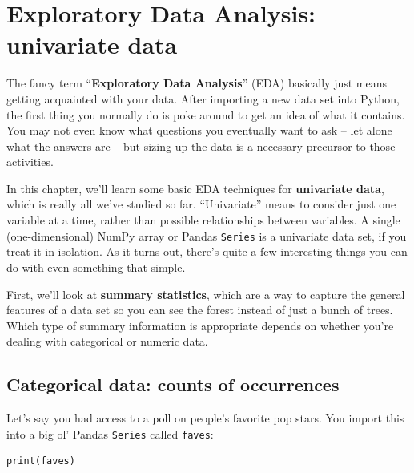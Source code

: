 
\chapter{Exploratory Data Analysis: univariate data}
\label{ch:edaUnivariate}


The fancy term ``\textbf{Exploratory Data Analysis}'' (EDA) basically just
means getting acquainted with your data. After importing a new data set into
Python, the first thing you normally do is poke around to get an idea of what
it contains. You may not even know what questions you eventually want to ask --
let alone what the answers are -- but sizing up the data is a necessary
precursor to those activities.


In this chapter, we'll learn some basic EDA techniques for \textbf{univariate
data}, which is really all we've studied so far. ``Univariate'' means to
consider just one variable at a time, rather than possible relationships
between variables. A single (one-dimensional) NumPy array or Pandas
\texttt{Series} is a univariate data set, if you treat it in isolation. As it
turns out, there's quite a few interesting things you can do with even
something that simple.



First, we'll look at \textbf{summary statistics}, which are a way to capture
the general features of a data set so you can see the forest instead of just a
bunch of trees. Which type of summary information is appropriate depends on
whether you're dealing with categorical or numeric data.

\section{Categorical data: counts of occurrences}


Let's say you had access to a poll on people's favorite pop stars. You import
this into a big ol' Pandas \texttt{Series} called \texttt{faves}:

\begin{Verbatim}[fontsize=\scriptsize,samepage=true,frame=single,framesep=3mm]
print(faves)
\end{Verbatim}

